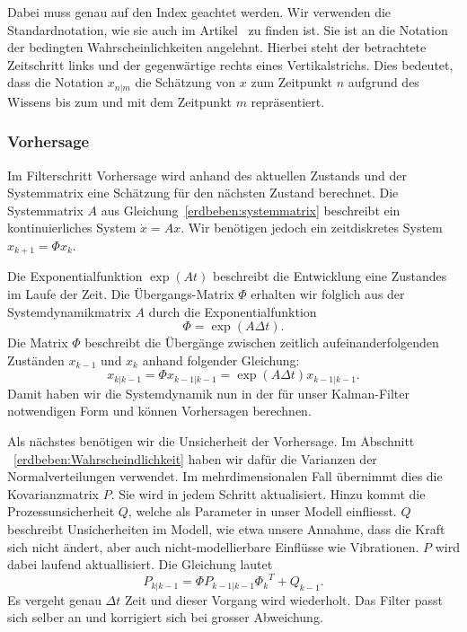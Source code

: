 Dabei muss genau auf den Index geachtet werden.
Wir verwenden die Standardnotation, wie sie auch im Artikel~\cite{erdbeben:wikipedia} zu finden ist.
Sie ist an die Notation der bedingten Wahrscheinlichkeiten angelehnt.
Hierbei steht der betrachtete Zeitschritt links und der gegenwärtige rechts eines Vertikalstrichs.
Dies bedeutet, dass die Notation $x_{n|m}$ die Schätzung von $x$ zum Zeitpunkt $n$ 
aufgrund des Wissens bis zum und mit dem Zeitpunkt $m$ repräsentiert.

\subsubsection*{Vorhersage}
Im Filterschritt Vorhersage wird anhand des aktuellen Zustands und der Systemmatrix eine Schätzung für den nächsten Zustand berechnet. 
Die Systemmatrix $A$ aus Gleichung~\eqref{erdbeben:systemmatrix} beschreibt ein kontinuierliches System $\dot x = Ax$.
Wir benötigen jedoch ein zeitdiskretes System $x_{k+1} = \Phi x_k$.

Die Exponentialfunktion $\exp(At)$ beschreibt die Entwicklung eine Zustandes im Laufe der Zeit.
Die Übergangs-Matrix $\Phi$ erhalten wir folglich aus der Systemdynamikmatrix $A$ durch die Exponentialfunktion
\[\Phi = \exp(A\Delta t). \]
Die Matrix $\Phi$ beschreibt die Übergänge zwischen zeitlich aufeinanderfolgenden Zuständen $x_{k-1}$ und $x_{k}$ anhand folgender Gleichung:
\[
{x_{k|k-1}}=\Phi{x_{k-1|k-1}}= \exp(A\Delta t){x_{k-1|k-1}}.
\] 
Damit haben wir die Systemdynamik nun in der für unser Kalman-Filter notwendigen Form und können Vorhersagen berechnen.

Als nächstes benötigen wir die Unsicherheit der Vorhersage.
Im Abschnitt ~\ref{erdbeben:Wahrscheindlichkeit} haben wir dafür die Varianzen der Normalverteilungen verwendet.
Im mehrdimensionalen Fall übernimmt dies die Kovarianzmatrix $P$.
%
Sie wird in jedem Schritt aktualisiert.
Hinzu kommt die Prozessunsicherheit $Q$, welche als Parameter in unser Modell einfliesst.
%
$Q$ beschreibt Unsicherheiten im Modell,
wie etwa unsere Annahme, dass die Kraft sich nicht ändert,
aber auch nicht-modellierbare Einflüsse wie Vibrationen.
$P$ wird dabei laufend aktuallisiert.
Die Gleichung lautet
\[
{P_{k|k-1}}=\Phi {P_{k-1|k-1}} {\Phi _{k}}^T + {Q_{k-1}}.
\] 
Es vergeht genau $\Delta t$ Zeit und dieser Vorgang wird wiederholt.  
Das Filter passt sich selber an und korrigiert sich bei grosser Abweichung.

